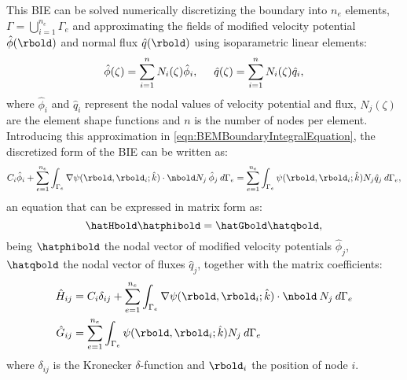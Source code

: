 This BIE can be solved numerically discretizing the boundary into $n_e$ elements, $\Gamma = \bigcup\limits_{i=1}^{n_e} \Gamma_{e}$ and approximating the fields of modified velocity potential $\hat{\phi}(\rbold)$ and normal flux $\hat{q}(\rbold)$ using isoparametric linear elements:
%
\begin{equation}
\label{eqn:BEMdiscretizacion}
\hat{\phi}(\zeta)=\sum_{i=1}^{n} N_{i}(\zeta) \hat{\phi}_{i} ,
\hspace{0.5cm}
\hat{q}(\zeta)=\sum_{i=1}^{n} N_{i}(\zeta) \hat{q}_{i},
\end{equation}
%
where $\hat{\phi}_{i}$ and $\hat{q}_{i}$ represent the nodal values of velocity potential and flux, $N_{j}(\zeta)$ are the element shape functions and $n$ is the number of nodes per element. Introducing this approximation in \eqref{eqn:BEMBoundaryIntegralEquation}, the discretized form of the BIE can be written as:
%
\begin{equation}
\label{eqn:BEMdiscretized BIE}
C_{i} \hat{\phi}_{i} + \sum_{e=1}^{n_{e}} \int_{\Gamma_{e}} \nabla \psi(\rbold,\rbold_i;\hat{k}) \cdot \nbold N_{j} \: \hat{\phi}_{j} \:d\Gamma_{e} = 
\sum_{e=1}^{n_{e}} \int_{\Gamma_{e}}  \psi(\rbold,\rbold_i;\hat{k}) N_{j} \hat{q}_{j} \:d\Gamma_{e},
\end{equation}
%
an equation that can be expressed in matrix form as:
%
\begin{equation}
\label{eqn:hatHphatGq}
\hatHbold \hatphibold = \hatGbold \hatqbold,
\end{equation}
%
being $\hatphibold$ the nodal vector of modified velocity potentials $\hat{\phi}_j$, $\hatqbold$ the nodal vector of fluxes $\hat{q}_j$, together with the matrix coefficients:
%
\begin{align}
\hat{H}_{ij} & = C_{i}\delta_{ij} + \sum_{e=1}^{n_{e}} \int_{\Gamma_{e}} \nabla \psi(\rbold,\rbold_i;\hat{k}) \cdot \nbold \: N_{j} \:d\Gamma_{e} \label{eqn:Hij} \\
\hat{G}_{ij} & = \sum_{e=1}^{n_{e}} \int_{\Gamma_{e}}  \psi(\rbold,\rbold_i;\hat{k}) N_{j} \:d\Gamma_{e} \label{eqn:Gij}
\end{align}
where $\delta_{ij}$ is the Kronecker $\delta$-function and $\rbold_i$ the position of node $i$.

